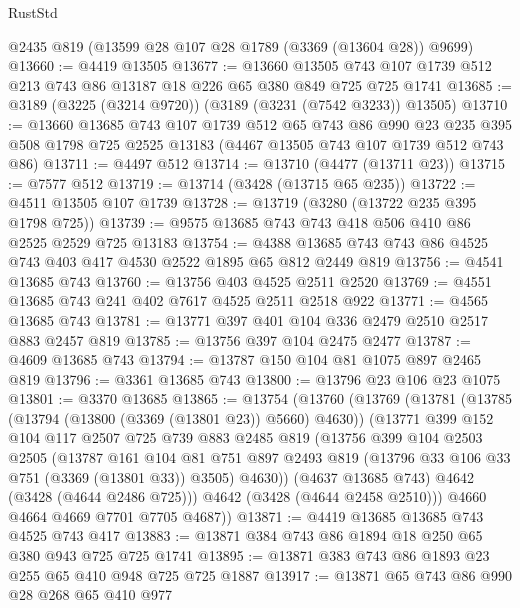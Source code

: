 \begin{lexlean}{RustStd}
\begin{coremodule}
    @2435
    @819
    (@13599 @28 @107 @28 @1789 (@3369 (@13604 @28)) @9699)
@13660 := @4419 @13505
@13677 := @13660
    @13505
    @743
    @107
    @1739
    @512
    @213
    @743
    @86
    @13187
    @18
    @226
    @65
    @380
    @849
    @725
    @725
    @1741
@13685 := @3189 (@3225 (@3214 @9720)) (@3189 (@3231 (@7542 @3233)) @13505)
@13710 := @13660
    @13685
    @743
    @107
    @1739
    @512
    @65
    @743
    @86
    @990
    @23
    @235
    @395
    @508
    @1798
    @725
    @2525
    @13183
    (@4467 @13505 @743 @107 @1739 @512 @743 @86)
@13711 := @4497 @512
@13714 := @13710 (@4477 (@13711 @23))
@13715 := @7577 @512
@13719 := @13714 (@3428 (@13715 @65 @235))
@13722 := @4511 @13505 @107 @1739
@13728 := @13719 (@3280 (@13722 @235 @395 @1798 @725))
@13739 := @9575 @13685 @743 @743 @418 @506 @410 @86 @2525 @2529 @725 @13183
@13754 := @4388 @13685 @743 @743 @86 @4525 @743 @403 @417 @4530 @2522 @1895 @65 @812 @2449 @819
@13756 := @4541 @13685 @743
@13760 := @13756 @403 @4525 @2511 @2520
@13769 := @4551 @13685 @743 @241 @402 @7617 @4525 @2511 @2518 @922
@13771 := @4565 @13685 @743
@13781 := @13771 @397 @401 @104 @336 @2479 @2510 @2517 @883 @2457 @819
@13785 := @13756 @397 @104 @2475 @2477
@13787 := @4609 @13685 @743
@13794 := @13787 @150 @104 @81 @1075 @897 @2465 @819
@13796 := @3361 @13685 @743
@13800 := @13796 @23 @106 @23 @1075
@13801 := @3370 @13685
@13865 := @13754
    (@13760
      (@13769
        (@13781
          (@13785 (@13794 (@13800 (@3369 (@13801 @23)) @5660) @4630))
          (@13771
            @399
            @152
            @104
            @117
            @2507
            @725
            @739
            @883
            @2485
            @819
            (@13756
              @399
              @104
              @2503
              @2505
              (@13787
                @161
                @104
                @81
                @751
                @897
                @2493
                @819
                (@13796 @33 @106 @33 @751 (@3369 (@13801 @33)) @3505)
                @4630))
            (@4637 @13685 @743)
            @4642
            (@3428 (@4644 @2486 @725)))
          @4642
          (@3428 (@4644 @2458 @2510)))
        @4660
        @4664
        @4669
        @7701
        @7705
        @4687))
@13871 := @4419 @13685 @13685 @743 @4525 @743 @417
@13883 := @13871 @384 @743 @86 @1894 @18 @250 @65 @380 @943 @725 @725 @1741
@13895 := @13871 @383 @743 @86 @1893 @23 @255 @65 @410 @948 @725 @725 @1887
@13917 := @13871
    @65
    @743
    @86
    @990
    @28
    @268
    @65
    @410
    @977

\end{coremodule}
\end{lexlean}
